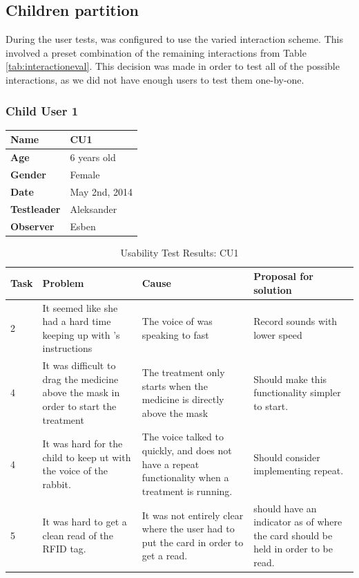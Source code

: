 \subsection{Children partition}

During the user tests, \ab{} was configured to use the varied interaction scheme. This involved a preset combination of the remaining interactions from Table \ref{tab:interactioneval}. This decision was made in order to test all of the possible interactions, as we did not have enough users to test them one-by-one. 

\subsubsection{Child User 1}
\begin{table}[H]
\centering
\begin{tabular}{| p{4.0cm} | p{4.0cm} |}
\hline
 \textbf{Name} & CU1 \\
 \hline
 \textbf{Age} & 6 years old \\
 \hline 
 \textbf{Gender} & Female \\
 \hline 
 \textbf{Date} & May 2nd, 2014 \\
 \hline
 \textbf{Testleader} & Aleksander \\
 \hline
 \textbf{Observer} & Esben \\
 \hline
\end{tabular}
\end{table}

\begin{table}[H]
\centering
\begin{tabular}{| p{1.0cm} | p{4.0cm} | p{4.0cm} | p{4.0cm} |}
\hline
	\textbf{Task} & \textbf{Problem} & \textbf{Cause} & \textbf{Proposal for solution} \\
	\hline
	2 & It seemed like she had a hard time keeping up with \ab{}'s instructions & The voice of \ab{} was speaking to fast & Record sounds with lower speed \\
	\hline
	4 & It was difficult to drag the medicine above the mask in order to start the treatment & The treatment only starts when the medicine is directly above the mask & Should make this functionality simpler to start.  \\
	\hline
	4 & It was hard for the child to keep ut with the voice of the rabbit. & The voice talked to quickly, and \app{} does not have a repeat functionality when a treatment is running. & Should consider implementing repeat.\\ 
	\hline
	5 & It was hard to get a clean read of the RFID tag. & It was not entirely clear where the user had to put the card in order to get a read. & \ab{} should have an indicator as of where the card should be held in order to be read.  \\
	\hline
\end{tabular}
\caption{Usability Test Results: CU1}
\label{tab:testchild1}
\end{table}

